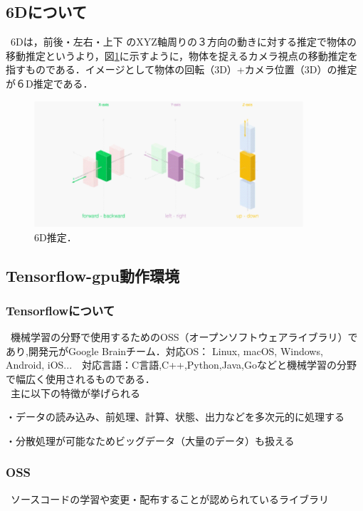 \documentclass[11pt,a4j,ascmac]{jarticle}
\begin{document}
\subsection{6Dについて}
\  6Dは，前後・左右・上下 のXYZ軸周りの３方向の動きに対する推定で物体の移動推定というより，図\ref{fig:6D}に示すように，物体を捉えるカメラ視点の移動推定を指すものである．イメージとして物体の回転（3D）+カメラ位置（3D）の推定が６D推定である．


      \begin{figure}[htpp]
      \centering
      \includegraphics[width=100mm]{6D.eps}
      \vspace*{20mm}
      \caption{6D推定．}
      \label{fig:6D}
      \end{figure}






\subsection{Tensorflow-gpu動作環境}


\subsubsection{Tensorflowについて}
\  機械学習の分野で使用するためのOSS（オープンソフトウェアライブラリ）であり,開発元がGoogle Brainチーム．対応OS： Linux, macOS, Windows, Android, iOS...　対応言語：C言語,C++,Python,Java,Goなどと機械学習の分野で幅広く使用されるものである．\\ 

\  主に以下の特徴が挙げられる

\begin{description}
  \item ・データの読み込み、前処理、計算、状態、出力などを多次元的に処理する
　\item ・分散処理が可能なためビッグデータ（大量のデータ）も扱える
\end{description}


\subsubsection {OSS}
\  ソースコードの学習や変更・配布することが認められているライブラリ
\end{document}
